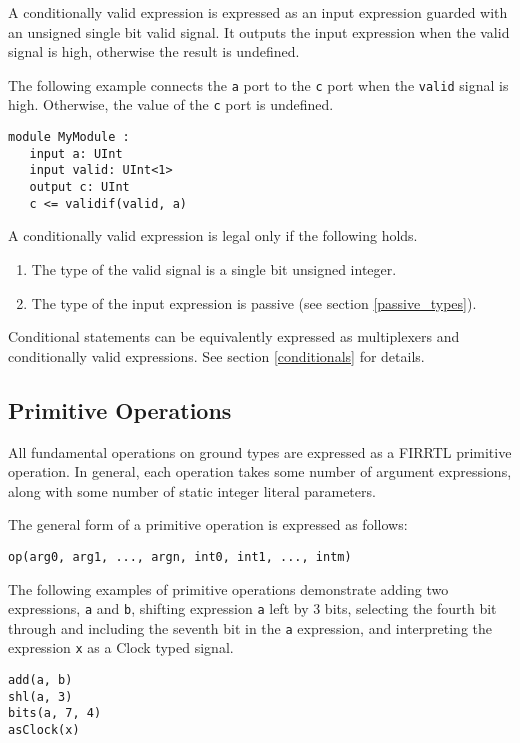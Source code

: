 \documentclass[12pt]{article}
\begin{document}
A conditionally valid expression is expressed as an input expression guarded with an unsigned single bit valid signal. It outputs the input expression when the valid signal is high, otherwise the result is undefined.

The following example connects the \verb|a| port to the \verb|c| port when the \verb|valid| signal is high. Otherwise, the value of the \verb|c| port is undefined.
\begin{lstlisting}
module MyModule :
   input a: UInt
   input valid: UInt<1>
   output c: UInt
   c <= validif(valid, a)
\end{lstlisting}

A conditionally valid expression is legal only if the following holds.
\begin{enumerate}
\item The type of the valid signal is a single bit unsigned integer.
\item The type of the input expression is passive (see section \ref{passive_types}).
\end{enumerate}

Conditional statements can be equivalently expressed as multiplexers and conditionally valid expressions. See section \ref{conditionals} for details.

\subsection{Primitive Operations}

All fundamental operations on ground types are expressed as a FIRRTL primitive operation. In general, each operation takes some number of argument expressions, along with some number of static integer literal parameters.

The general form of a primitive operation is expressed as follows:
\begin{lstlisting}
op(arg0, arg1, ..., argn, int0, int1, ..., intm)
\end{lstlisting}

The following examples of primitive operations demonstrate adding two expressions, \verb|a| and \verb|b|, shifting expression \verb|a| left by 3 bits, selecting the fourth bit through and including the seventh bit in the \verb|a| expression, and interpreting the expression \verb|x| as a Clock typed signal.
\begin{lstlisting}
add(a, b)
shl(a, 3)
bits(a, 7, 4)
asClock(x)
\end{lstlisting}
\end{document}
